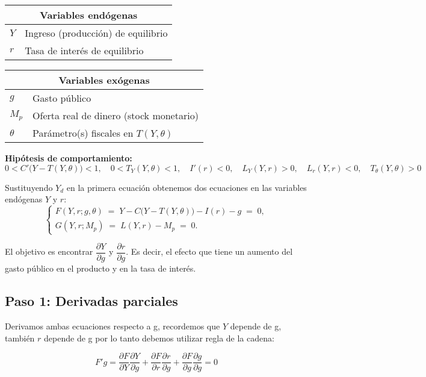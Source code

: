 \documentclass{article}
\begin{document}
\begin{table}[H]
\centering
\begin{tabular}{|l|l|}
\hline
\multicolumn{2}{|c|}{\textbf{\color{teal}Variables endógenas}} \\ \hline
$Y$ & Ingreso (producción) de equilibrio \\ \hline
$r$ & Tasa de interés de equilibrio \\ \hline
\end{tabular}
\quad
\begin{tabular}{|l|l|}
\hline
\multicolumn{2}{|c|}{\textbf{\color{teal}Variables exógenas}} \\ \hline
$g$      & Gasto público \\ \hline
$M_p$    & Oferta real de dinero (stock monetario) \\ \hline
$\theta$ & Parámetro(s) fiscales en $T(Y,\theta)$ \\ \hline
\end{tabular}
\end{table}

\noindent
\textbf{\color{teal}Hipótesis de comportamiento:}
\[
0 < C'\bigl(Y - T(Y,\theta)\bigr) < 1,
\quad
0 < T_Y(Y,\theta) < 1,
\quad
I'(r) < 0,
\quad
L_Y(Y,r) > 0,
\quad
L_r(Y,r) < 0,
\quad
T_\theta(Y,\theta) >0
\]


Sustituyendo \(Y_d\) en la primera ecuación obtenemos dos ecuaciones en las variables endógenas \(Y\) y \(r\):
\[
\begin{cases}
F(Y,r;g,\theta)\;=\;Y - C\bigl(Y - T(Y,\theta)\bigr) - I(r) - g \;=\;0,\\[6pt]
G(Y,r;M_p)\;=\;L(Y,r) - M_p \;=\;0.
\end{cases}
\]

El objetivo es encontrar $\dfrac{\partial Y}{\partial g}$ y $\dfrac{\partial r}{\partial g}$. Es decir, el efecto que tiene un aumento del gasto público en el producto y en la tasa de interés.



\subsection*{Paso 1: Derivadas parciales}

Derivamos ambas ecuaciones respecto a g, recordemos que $Y$ depende de g, también $r$ depende de g por lo tanto debemos utilizar regla de la cadena:

\begin{equation*}
F'g= \dfrac{\partial F}{\partial Y} \dfrac{\partial Y}{\partial g} +\dfrac{\partial F}{\partial r} \dfrac{\partial r}{\partial g} + \dfrac{\partial F}{\partial g} \dfrac{\partial g}{\partial g} =0
\end{equation*}
\end{document}
